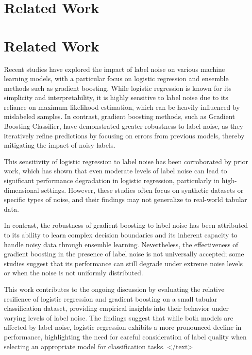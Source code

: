 \documentclass{article}
\begin{document}
\section{Related Work}
\section{Related Work}

Recent studies have explored the impact of label noise on various machine learning models, with a particular focus on logistic regression and ensemble methods such as gradient boosting. While logistic regression is known for its simplicity and interpretability, it is highly sensitive to label noise due to its reliance on maximum likelihood estimation, which can be heavily influenced by mislabeled samples. In contrast, gradient boosting methods, such as Gradient Boosting Classifier, have demonstrated greater robustness to label noise, as they iteratively refine predictions by focusing on errors from previous models, thereby mitigating the impact of noisy labels. 

This sensitivity of logistic regression to label noise has been corroborated by prior work, which has shown that even moderate levels of label noise can lead to significant performance degradation in logistic regression, particularly in high-dimensional settings. However, these studies often focus on synthetic datasets or specific types of noise, and their findings may not generalize to real-world tabular data. 

In contrast, the robustness of gradient boosting to label noise has been attributed to its ability to learn complex decision boundaries and its inherent capacity to handle noisy data through ensemble learning. Nevertheless, the effectiveness of gradient boosting in the presence of label noise is not universally accepted; some studies suggest that its performance can still degrade under extreme noise levels or when the noise is not uniformly distributed. 

This work contributes to the ongoing discussion by evaluating the relative resilience of logistic regression and gradient boosting on a small tabular classification dataset, providing empirical insights into their behavior under varying levels of label noise. The findings suggest that while both models are affected by label noise, logistic regression exhibits a more pronounced decline in performance, highlighting the need for careful consideration of label quality when selecting an appropriate model for classification tasks.
</text>
\end{document}
